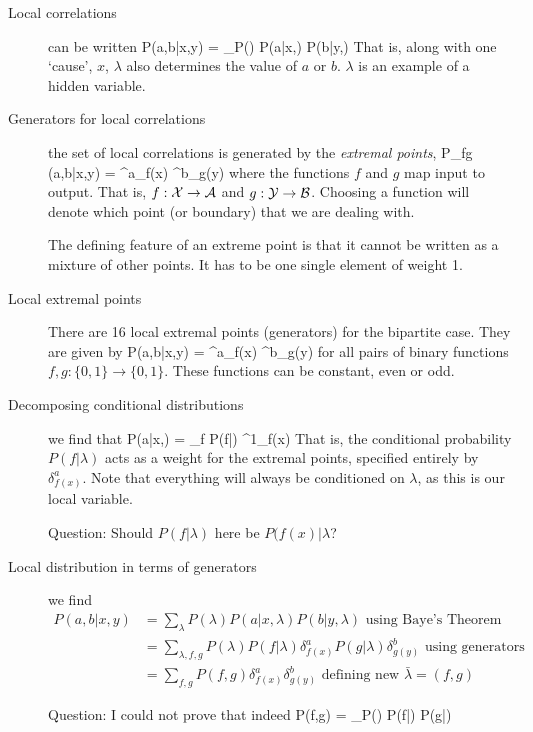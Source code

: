 \begin{description}
\item[Local correlations] can be written
\beq
P(a,b|x,y) = \sum_\lambda P(\lambda) P(a|x,\lambda) P(b|y,\lambda)
\eeq
That is, along with one `cause', $x$, $\lambda$ also determines the value of $a$ or $b$. $\lambda$ is an example of a hidden variable. 

\item[Generators for local correlations] the set of local correlations is generated by the \emph{extremal points}, 
\beq
P_{fg} (a,b|x,y) = \delta^a_{f(x)} \delta^b_{g(y)}
\eeq
where the functions $f$ and $g$ map input to output. That is, $f:\cal{X} \rightarrow \cal{A}$ and $g: \cal{Y} \rightarrow \cal{B}$. Choosing a function will denote which point (or boundary) that we are dealing with. 

The defining feature of an extreme point is that it cannot be written as a mixture of other points. It has to be one single element of weight 1. 

\item[Local extremal points] There are 16 local extremal points (generators) for the bipartite case. They are given by 
\beq
P(a,b|x,y) = \delta^a_{f(x)} \delta^b_{g(y)}
\eeq
for all pairs of  binary functions $f,g: \{0,1\} \rightarrow \{0,1\}$. These functions can be constant, even or odd. 

\item[Decomposing conditional distributions] we find that
\beq
P(a|x,\lambda) = \sum_f P(f|\lambda) \delta^1_{f(x)}
\eeq
That is, the conditional probability $P(f|\lambda)$ acts as a weight for the extremal points, specified entirely by $\delta^a_{f(x)}$. Note that everything will always be conditioned on $\lambda$, as this is our local variable. 

Question: Should $P(f|\lambda)$ here be $P(f(x)|\lambda$? 

\item[Local distribution in terms of generators] we find
\begin{align}
P(a,b|x,y) &= \sum_\lambda P(\lambda) P(a|x,\lambda) P(b|y, \lambda) \mbox{     using Baye's Theorem} \nonumber \\
&= \sum_{\lambda, f, g} P(\lambda) P(f|\lambda) \delta^a_{f(x)} P(g|\lambda) \delta^b_{g(y)} \mbox{     using generators} \nonumber \\
&=\sum_{f,g} P(f,g) \delta^a_{f(x)} \delta^b_{g(y)}  \mbox{     defining new }\bar{\lambda} = (f,g)
\end{align}

Question: I could not prove that indeed
\beq
P(f,g) = \sum_\lambda P(\lambda) P(f|\lambda) P(g|\lambda)
\eeq


\end{description}
